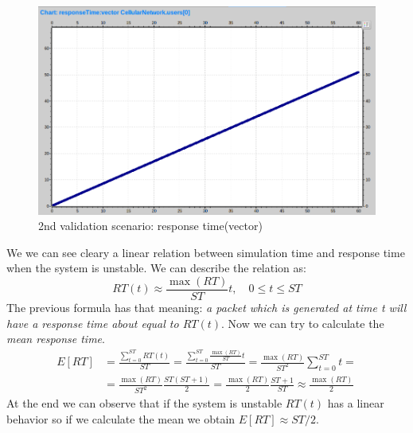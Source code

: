 \begin{figure}[H]
  \includegraphics[width=1\textwidth]{images/response-timeVec}
  \caption{2nd validation scenario: response time(vector)}
  \label{fig:2nd validation scenario: response time(vector)}
\end{figure}
We we can see cleary a linear relation between simulation time and response time when the system is unstable. We can describe the relation as:
\begin{equation} 
	RT(t) \approx \frac{\max(RT)}{ST}t, \quad 0\le t \le ST 
\end{equation}
The previous formula has that meaning: \textit{a packet which is generated at time t will have a response time about equal to \(RT(t)\)}. Now we can try to calculate the \textit{mean response time}.
\begin{equation}
\begin{split}
E[RT] &= \frac{\sum\limits^{ST}_{t=0} RT(t)}{ST} = \frac{\sum\limits^{ST}_{t=0} \frac{\max(RT)}{ST}t}{ST} = \frac{\max(RT)}{ST^2}\sum\limits^{ST}_{t=0}t =
	\\ &= \frac{\max(RT)}{ST^2}\frac{ST(ST+1)}{2} = \frac{\max(RT)}{2}\frac{ST+1}{ST} \approx \frac{\max(RT)}{2}
\end{split}
\end{equation}
At the end we can observe that if the system is unstable \(RT(t)\) has a linear behavior so if we calculate the mean we obtain \(E[RT] \approx ST/2\). 
